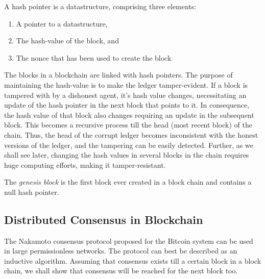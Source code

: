 \begin{definition}
	A hash pointer is a datastructure, comprising three elements:
	\begin{enumerate}
		\item A pointer to a datastructure,
		\item The hash-value of the block, and
		\item The nonce that has been used to create the block 
	\end{enumerate}
\end{definition}

The blocks in a blockchain are linked with hash pointers. The purpose of maintaining the hash-value is to make the ledger 
tamper-evident. If a block is tampered with by a dishonest agent, it's hash value changes, necessitating an update of the hash 
pointer in the next block that points to it. In consequence, the hash value of that block also changes requiring 
an update in the subsequent block. This becomes a recursive process till the head (most recent block) of the chain. Thus, the 
head of the corrupt ledger becomes inconsistent with the honest versions of the ledger, and the tampering can be easily detected. 
Further, as we shall see later, changing the hash values in several blocks in the chain requires huge computing efforts, making 
it tamper-resistant.

\begin{definition} 
	The {\em genesis block} is the first block ever created in a block chain and contains a null hash pointer. 
\end{definition}

\subsection{Distributed Consensus in Blockchain}
\label{sec:ledger:nakamoto-consensus}

 
The Nakamoto consensus protocol proposed for the Bitcoin system can be used in large permissionless networks. The protocol can 
best be described as an inductive algorithm. Assuming that consensus exists till a certain block in a block chain, we shall show
that consensus will be reached for the next block too. 

